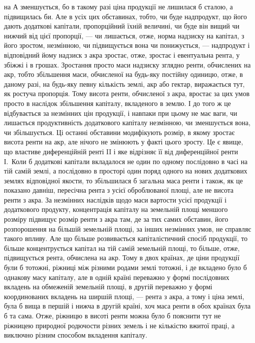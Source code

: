 \parcont{}  %
на $А$ зменшується, бо в такому разі ціна продукції не лишилася б сталою,
а підвищилась би. Але в усіх цих обставинах, тобто, чи буде надпродукт, що
його дають додаткові капітали, пропорційний їхній величині, чи буде він
вищий чи нижчий від цієї пропорції, — чи лишається, отже, норма надзиску на
капітал, з його зростом, незмінною, чи підвищується вона чи понижується, —
надпродукт і відповідний йому надзиск з акра зростає, отже, зростає і
евентуальна рента, у збіжжі і в грошах. Зростання просто маси надзиску зглядно
ренти, обчислених на акр, тобто збільшення маси, обчисленої на будь-яку постійну
одиницю, отже, в даному разі, на будь-яку певну кількість землі, акр або гектар,
виражається тут, як ростуча пропорція. Тому висота ренти, обчисленої з акра,
вростає за цих умов просто в наслідок збільшення капіталу, вкладеного в землю.
І до того ж це відбувається за незмінних цін продукції, і навпаки при цьому
не має ваги, чи лишається продуктивність додаткового капіталу незмінною, чи
зменшується вона, чи збільшується. Ці останні обставини модифікують розмір,
в якому зростає висота ренти на акр, але нічого не змінюють у факті цього
зросту. Це є явище, що властиве диференційній ренті II і яке відрізняє її від
диференційної ренти І.~Коли б додаткові капітали вкладалося не один по
одному послідовно в часі на тій самій землі, а послідовно в просторі один
поряд одного на нових додаткових землях відповідної якости, то збільшилася б
загальна маса ренти і також, як це показано давніш, пересічна рента з усієї
оброблюваної площі, але не висота ренти з акра. За незмінних наслідків щодо
маси вартости усієї продукції і додаткового продукту, концентрація капіталу на
земельній площі меншого розміру підвищує розмір ренти з акра там, де за тих
самих обставин, його розпорошення на більшій земельній площі, за інших незмінних
умов, не справляє такого впливу. Але що більше розвивається капіталістичний
спосіб продукції, то більше концентрується капітал на тій самій земельній
площі, то більше, отже, підвищується рента, обчислена на акр. Тому в
двох країнах, де ціни продукції були б тотожні, ріжниці між різними родами
землі тотожні, і де вкладено було б однакову масу капіталу, але в одній країні
переважно у формі послідовних вкладень на обмеженій земельній площі, в другій
переважно у формі координованих вкладень на ширшій площі, — рента з акра, а
тому і ціна землі, була б вища в першій і нижча в другій країні, хоч маса
ренти в обох країнах була б та сама. Отже, ріжницю в висоті ренти можна
було б пояснити тут не ріжницею природної родючости різних земель і не
кількістю вжитої праці, а виключно різним способом вкладення капіталу.

